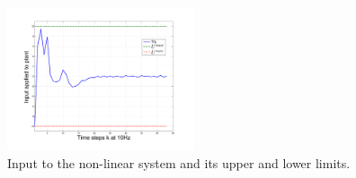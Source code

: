 \begin{figure}
\includegraphics[width=0.49\textwidth]{figs/u_and_limits_manip.pdf}
\caption{Input to the non-linear system and its upper and lower limits.}
\label{fig:u_and_limits}
\end{figure}


